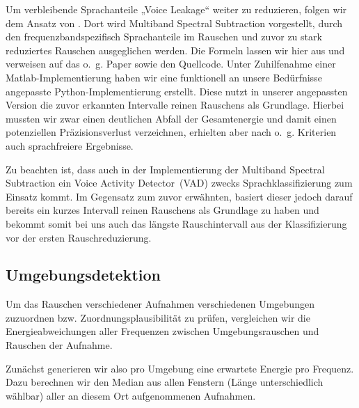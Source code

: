 \documentclass[
	fontsize=10.5pt,
	marginpar=false,
	ngerman,
	accentcolor=3d
	]{tudapub}
\begin{document}
Um verbleibende Sprachanteile „Voice Leakage“ weiter zu reduzieren, folgen wir dem Ansatz von \cite{kamath_multi-band_2002}. Dort wird Multiband Spectral Subtraction vorgestellt, durch den frequenzbandspezifisch Sprachanteile im Rauschen und zuvor zu stark reduziertes Rauschen ausgeglichen werden. Die Formeln lassen wir hier aus und verweisen auf das o.~g. Paper sowie den Quellcode. Unter Zuhilfenahme einer Matlab-Implementierung \cite{zavarehei_multi-band_nodate} haben wir eine funktionell an unsere Bedürfnisse angepasste Python-Implementierung erstellt. Diese nutzt in unserer angepassten Version die zuvor erkannten Intervalle reinen Rauschens als Grundlage. Hierbei mussten wir zwar einen deutlichen Abfall der Gesamtenergie und damit einen potenziellen Präzisionsverlust verzeichnen, erhielten aber nach o.~g. Kriterien auch sprachfreiere Ergebnisse.

Zu beachten ist, dass auch in der Implementierung der Multiband Spectral Subtraction ein Voice Activity Detector~(VAD) zwecks Sprachklassifizierung zum Einsatz kommt. Im Gegensatz zum zuvor erwähnten, basiert dieser jedoch darauf bereits ein kurzes Intervall reinen Rauschens als Grundlage zu haben und bekommt somit bei uns auch das längste Rauschintervall aus der Klassifizierung vor der ersten Rauschreduzierung.

\pagebreak
\subsection{Umgebungsdetektion}
\label{envdetect}

Um das Rauschen verschiedener Aufnahmen verschiedenen Umgebungen zuzuordnen bzw. Zuordnungsplausibilität zu prüfen, vergleichen wir die Energieabweichungen aller Frequenzen zwischen Umgebungsrauschen und Rauschen der Aufnahme.

Zunächst generieren wir also pro Umgebung eine erwartete Energie pro Frequenz. Dazu berechnen wir den Median aus allen Fenstern (Länge unterschiedlich wählbar) aller an diesem Ort aufgenommenen Aufnahmen.
\end{document}
